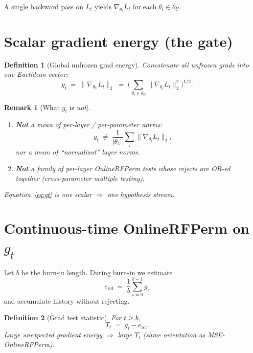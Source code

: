\documentclass[11pt]{article}
\newtheorem{definition}{Definition}
\newtheorem{remark}{Remark}
\newcommand{\gradU}{\nabla_{\theta_U}}
\begin{document}
A single backward pass on $L_t$ yields
$\nabla_{\theta_i} L_t$ for each $\theta_i\in\theta_U$.

\section{Scalar gradient energy (the gate)}
\label{sec:scalar}

\begin{definition}[Global unfrozen grad energy]
Concatenate all unfrozen grads into one Euclidean vector:
\begin{equation}
\label{eq:gt}
  g_t
  \;=\;
  \bigl\| \gradU L_t \bigr\|_2
  \;=\;
  \Biggl(
    \sum_{\theta_i \in \theta_U}
      \bigl\| \nabla_{\theta_i} L_t \bigr\|_2^{2}
  \Biggr)^{1/2}.
\end{equation}
\end{definition}

\begin{remark}[What $g_t$ is \emph{not}]
\label{rem:not}
\begin{enumerate}[leftmargin=*,itemsep=0.25em]
  \item \textbf{Not} a mean of per-layer / per-parameter norms:
  \[
    g_t
    \;\neq\;
    \frac{1}{|\theta_U|}
    \sum_{i}
      \bigl\| \nabla_{\theta_i} L_t \bigr\|_2,
  \]
  nor a mean of ``normalized'' layer norms.
  \item \textbf{Not} a family of per-layer OnlineRFPerm tests whose
  rejects are OR-ed together (cross-parameter multiple testing).
\end{enumerate}
Equation~\eqref{eq:gt} is one scalar $\Rightarrow$ one hypothesis stream.
\end{remark}

\section{Continuous-time OnlineRFPerm on $g_t$}
\label{sec:rfperm}

Let $b$ be the burn-in length. During burn-in we estimate
\begin{equation}
\label{eq:eref}
  e_{\mathrm{ref}}
  \;=\;
  \frac{1}{b}\sum_{s=0}^{b-1} g_s
\end{equation}
and accumulate history without rejecting.

\begin{definition}[Grad test statistic]
For $t\ge b$,
\begin{equation}
\label{eq:Tt}
  T_t \;=\; g_t - e_{\mathrm{ref}}.
\end{equation}
Large unexpected gradient energy $\Rightarrow$ large $T_t$
(same orientation as MSE-OnlineRFPerm).
\end{definition}
\end{document}
